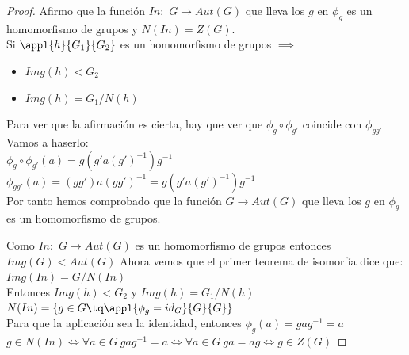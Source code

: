 \documentclass{apuntes}
\begin{document}
\begin{proof}
Afirmo que la función $In:$ $G \longrightarrow Aut(G)$ que lleva los $g$ en $\phi _g$ es un homomorfismo de grupos y $N(In) = Z(G)$. \\
Si $\appl{h}{G_1}{G_2}$ es un homomorfismo de grupos $\implies $ 
\begin{itemize}
\item $Img(h) < G_2$
\item $Img(h) = G_1/N(h)$
\end{itemize}

Para ver que la afirmación es cierta, hay que ver que $\phi _g \circ \phi _{g'}$ coincide con $\phi _{gg'}$\\
Vamos a haserlo:\\
$\phi _g \circ \phi _{g'} (a) = g(g'a(g')^{-1})g^{-1}$\\
$\phi _{gg'} (a) = (gg')a(gg')^{-1} = g(g'a(g')^{-1})g^{-1}$\\
Por tanto hemos comprobado que la función $G \longrightarrow Aut(G)$ que lleva los $g$ en $\phi _g$ es un homomorfismo de grupos.

Como $In:$ $G \longrightarrow Aut(G)$ es un homomorfismo de grupos entonces $Img(G) < Aut(G)$
Ahora vemos que el primer teorema de isomorfía dice que:\\
$Img(In) = G/N(In)$ \\
Entonces $Img(h) < G_2$ y $Img(h) = G_1/N(h)$\\

$N(In) = \{ g\in G \tq \appl{\phi _g = id_G}{G}{G} \}$\\
Para que la aplicación sea la identidad, entonces $\phi _g(a) = gag^{-1} = a$\\
$g\in N(In) \iff \forall a \in G\ gag^{-1} = a \iff \forall a \in G\ ga = ag \iff g \in Z(G)$
\end{proof}
\end{document}
